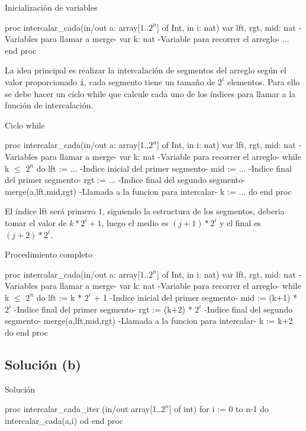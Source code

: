 \begin{codebox}{Inicialización de variables}
\begin{pascallike}
proc intercalar_cada(in/out a: array[1..$2^n$] of Int, in i: nat)
    var lft, rgt, mid: nat {-Variables para llamar a merge-}
    var k: nat {-Variable para recorrer el arreglo-}
    ...
end proc
\end{pascallike}
\end{codebox}
La idea principal es realizar la intercalación de segmentos del arreglo según el valor proporcionado \texttt{i}, cada segmento tiene un tamaño de $2^i$ elementos. Para ello se debe hacer un ciclo while que calcule cada uno de los índices para llamar a la función de intercalación.

\begin{codebox}{Ciclo while}
\begin{pascallike}
proc intercalar_cada(in/out a: array[1..$2^n$] of Int, in i: nat)
    var lft, rgt, mid: nat {-Variables para llamar a merge-}
    var k: nat {-Variable para recorrer el arreglo-}
    while k $\leq$ $2^n$ do
    lft := ... {-Indice inicial del primer segmento-}
    mid := ... {-Indice final del primer segmento-}
    rgt := ... {-Indice final del segundo segmento-}
    merge(a,lft,mid,rgt) {-Llamada a la funcion para intercalar-}
    k := ...
    do
end proc
\end{pascallike}
\end{codebox}
El índice lft será primero $1$, siguiendo la estructura de los segmentos, deberia tomar el valor de $k * 2^i + 1$, luego el medio es $(j+1) * 2^i$ y el final es $(j+2) * 2^i$.

\begin{codebox}{Procedimiento completo}
\begin{pascallike}
proc intercalar_cada(in/out a: array[1..$2^n$] of Int, in i: nat)
    var lft, rgt, mid: nat {-Variables para llamar a merge-}
    var k: nat {-Variable para recorrer el arreglo-}
    while k $\leq$ $2^n$ do
    lft := k * $2^i$ + 1 {-Indice inicial del primer segmento-}
    mid := (k+1) * $2^i$ {-Indice final del primer segmento-}
    rgt := (k+2) * $2^i$ {-Indice final del segundo segmento-}
    merge(a,lft,mid,rgt) {-Llamada a la funcion para intercalar-}
    k := k+2
    do
end proc
\end{pascallike}
\end{codebox}

\subsection{Solución (b)}
\begin{codebox}{Solución}
\begin{pascallike}
proc intercalar_cada_iter (in/out array[1..$2^n$] of int)
    for i := 0 to n-1 do
    intercalar_cada(a,i)
    od
end proc
\end{pascallike}
\end{codebox}

